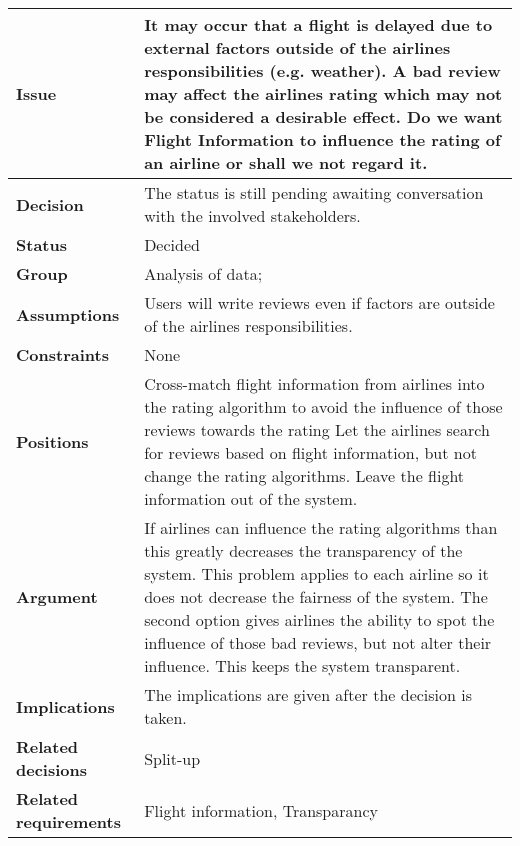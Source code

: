 
\label{dd:flight-inf}
\begin{tabular}{ l  p{10cm}}
\hline
\bf Issue & It may occur that a flight is delayed due to external factors outside of the airlines responsibilities (e.g. weather). A bad review may affect the airlines rating which may not be considered a desirable effect. Do we want Flight Information to influence the rating of an airline or shall we not regard it. \\
\hline
\bf Decision & The status is still pending awaiting conversation with the involved stakeholders. \\
\hline
\bf Status & Decided \\
\hline
\bf Group & Analysis of data; \\
\hline
\bf Assumptions & Users will write reviews even if factors are outside of the airlines responsibilities. \\
\hline
\bf Constraints & None \\
\hline
\bf Positions & Cross-match flight information from airlines into the rating algorithm to avoid the influence of those reviews towards the rating \newline\newline
Let the airlines search for reviews based on flight information, but not change the rating algorithms. \newline\newline
Leave the flight information out of the system. \\
\hline
\bf Argument & If airlines can influence the rating algorithms than this greatly decreases the transparency of the system. This problem applies to each airline so it does not decrease the fairness of the system. The second option gives airlines the ability to spot the influence of those bad reviews, but not alter their influence. This keeps the system transparent. \\
\hline
\bf Implications &The implications are given after the decision is taken. \\
\hline
\bf Related decisions & Split-up \\
\hline
\bf Related requirements  & Flight information, Transparancy \\
\hline
\end{tabular}
